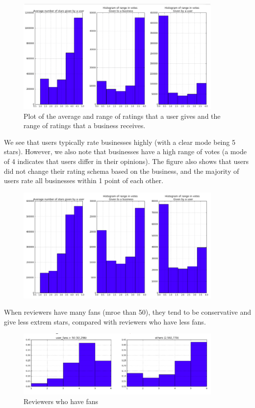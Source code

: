 \documentclass[11pt]{article}
\begin{document}
\begin{figure}[H]
\centering
\includegraphics[width=0.9\textwidth]{./ac209/avgstarsusersbusinesses.png}
\caption{Plot of the average and range of ratings that a user gives and the range of ratings that a business receives.}
\end{figure}

\par We see that users typically rate businesses highly (with a clear mode being 5 stars). However, we also note that businesses have a high range of votes (a mode of 4 indicates that users differ in their opinions). The figure also shows that users did not change their rating schema based on the business, and the majority of users rate all businesses within 1 point of each other.


\begin{figure}[H]
\centering
\includegraphics[width=0.9\textwidth]{./ac209/avgstarsusersbusinesses-filter.png}
\caption{}
\end{figure}



\par When reviewers have many fans (mroe than 50), they tend to be conservative and give less extrem stars, compared with reviewers who have less fans.
\begin{figure}[H]
\centering
\includegraphics[width=0.9\textwidth]{./ac209/lotsoffans.png}
\caption{Reviewers who have fans}
\end{figure}
\end{document}

